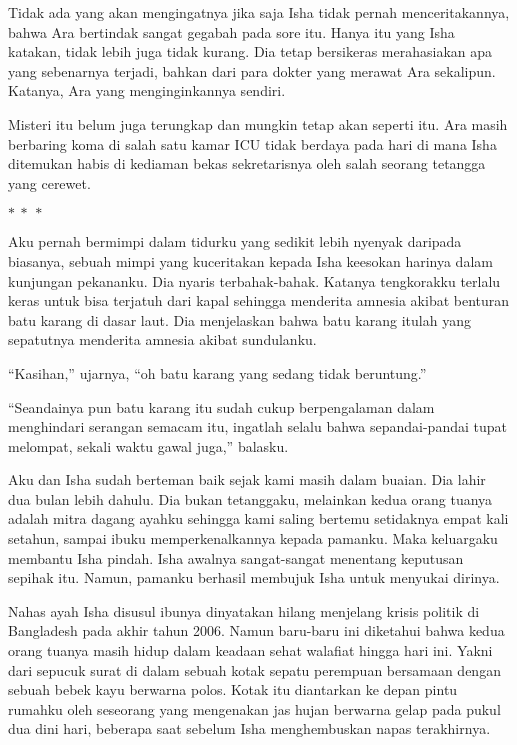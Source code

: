 \documentclass[smalldemyvopaper,11pt,twoside,onecolumn,openright,extrafontsizes]{memoir}
\newcommand\separator{
  \begin{center}
    \(\ast~\ast~\ast\)
  \end{center}
}
\begin{document}
Tidak ada yang akan mengingatnya jika saja Isha tidak pernah menceritakannya, bahwa Ara bertindak sangat gegabah pada sore itu. Hanya itu yang Isha katakan, tidak lebih juga tidak kurang. Dia tetap bersikeras merahasiakan apa yang sebenarnya terjadi, bahkan dari para dokter yang merawat Ara sekalipun. Katanya, Ara yang menginginkannya sendiri.


Misteri itu belum juga terungkap dan mungkin tetap akan seperti itu. Ara masih berbaring koma di salah satu kamar ICU tidak berdaya pada hari di mana Isha ditemukan habis di kediaman bekas sekretarisnya oleh salah seorang tetangga yang cerewet.

\separator{}


Aku pernah bermimpi dalam tidurku yang sedikit lebih nyenyak daripada biasanya, sebuah mimpi yang kuceritakan kepada Isha keesokan harinya dalam kunjungan pekananku. Dia nyaris terbahak-bahak. Katanya tengkorakku terlalu keras untuk bisa terjatuh dari kapal sehingga menderita amnesia akibat benturan batu karang di dasar laut. Dia menjelaskan bahwa batu karang itulah yang sepatutnya menderita amnesia akibat sundulanku.

``Kasihan,'' ujarnya, ``oh batu karang yang sedang tidak beruntung.''


``Seandainya pun batu karang itu sudah cukup berpengalaman dalam menghindari serangan semacam itu, ingatlah selalu bahwa sepandai-pandai tupat melompat, sekali waktu gawal juga,'' balasku.

Aku dan Isha sudah berteman baik sejak kami masih dalam buaian. Dia lahir dua bulan lebih dahulu. Dia bukan tetanggaku, melainkan kedua orang tuanya adalah mitra dagang ayahku sehingga kami saling bertemu setidaknya empat kali setahun, sampai ibuku memperkenalkannya kepada pamanku. Maka keluargaku membantu Isha pindah. Isha awalnya sangat-sangat menentang keputusan sepihak itu. Namun, pamanku berhasil membujuk Isha untuk menyukai dirinya.


Nahas ayah Isha disusul ibunya dinyatakan hilang menjelang krisis politik di Bangladesh pada akhir tahun 2006. Namun baru-baru ini diketahui bahwa kedua orang tuanya masih hidup dalam keadaan sehat walafiat hingga hari ini. Yakni dari sepucuk surat di dalam sebuah kotak sepatu perempuan bersamaan dengan sebuah bebek kayu berwarna polos. Kotak itu diantarkan ke depan pintu rumahku oleh seseorang yang mengenakan jas hujan berwarna gelap pada pukul dua dini hari, beberapa saat sebelum Isha menghembuskan napas terakhirnya.
\end{document}
